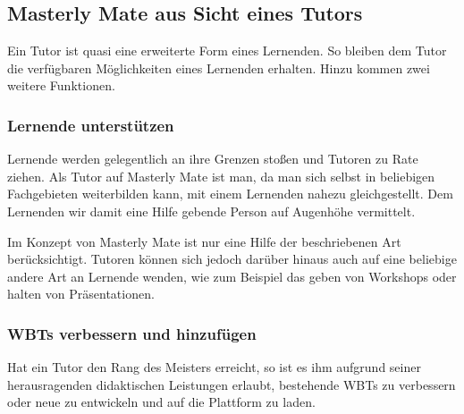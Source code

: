 \subsection{Masterly Mate aus Sicht eines Tutors}
Ein Tutor ist quasi eine erweiterte Form eines Lernenden. So bleiben dem Tutor
die verfügbaren Möglichkeiten eines Lernenden erhalten. Hinzu kommen zwei
weitere Funktionen.

\subsubsection{Lernende unterstützen}
Lernende werden gelegentlich an ihre Grenzen stoßen und Tutoren zu Rate ziehen.
Als Tutor auf Masterly Mate ist man, da man sich selbst in beliebigen
Fachgebieten weiterbilden kann, mit einem Lernenden nahezu gleichgestellt. Dem
Lernenden wir damit eine Hilfe gebende Person auf Augenhöhe vermittelt. 

Im Konzept von Masterly Mate ist nur eine Hilfe der beschriebenen Art
berücksichtigt. Tutoren können sich jedoch darüber hinaus auch auf eine
beliebige andere Art an Lernende wenden, wie zum Beispiel das geben von
Workshops oder halten von Präsentationen.

\subsubsection{WBTs verbessern und hinzufügen}
Hat ein Tutor den Rang des Meisters erreicht, so ist es ihm aufgrund seiner
herausragenden didaktischen Leistungen erlaubt, bestehende WBTs zu verbessern
oder neue zu entwickeln und auf die Plattform zu laden.